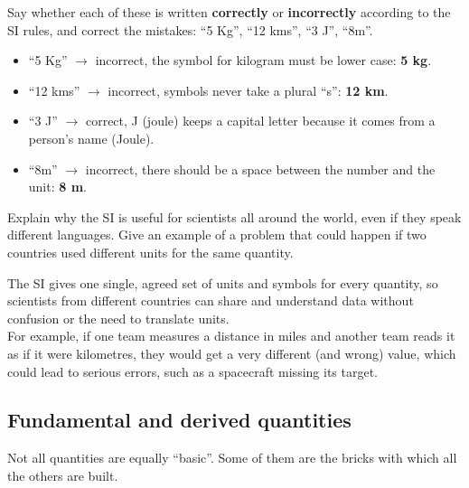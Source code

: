 \begin{exercise}
    Say whether each of these is written \textbf{correctly} or \textbf{incorrectly} according to the SI rules, and correct the mistakes: ``5 Kg'', ``12 kms'', ``3 J'', ``8m''.
    \begin{solu}
        \begin{itemize}
            \item ``5 Kg'' \(\to\) incorrect, the symbol for kilogram must be lower case: \textbf{5 kg}.
            \item ``12 kms'' \(\to\) incorrect, symbols never take a plural ``s'': \textbf{12 km}.
            \item ``3 J'' \(\to\) correct, J (joule) keeps a capital letter because it comes from a person's name (Joule).
            \item ``8m'' \(\to\) incorrect, there should be a space between the number and the unit: \textbf{8 m}.
        \end{itemize}
    \end{solu}
\end{exercise}

\begin{exercise}
    Explain why the SI is useful for scientists all around the world, even if they speak different languages. Give an example of a problem that could happen if two countries used different units for the same quantity.
    \begin{solu}
        The SI gives one single, agreed set of units and symbols for every quantity, so scientists from different countries can share and understand data without confusion or the need to translate units. \\
        For example, if one team measures a distance in miles and another team reads it as if it were kilometres, they would get a very different (and wrong) value, which could lead to serious errors, such as a spacecraft missing its target.
    \end{solu}
\end{exercise}


\subsection{Fundamental and derived quantities}

Not all quantities are equally ``basic''. Some of them are the bricks with which all the others are built.

